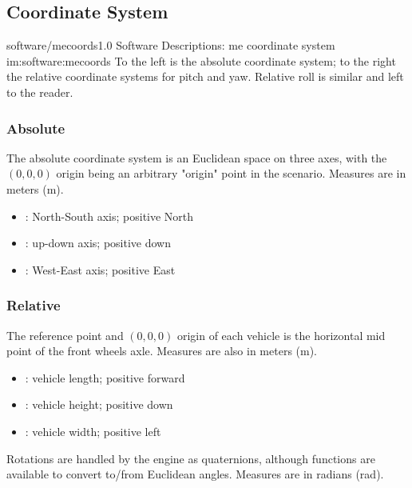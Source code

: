 \subsection{Coordinate System}

\begin{image}
	{software/mecoords}{1.0}
	{Software Descriptions: \gls{me} coordinate system}
	{im:software:mecoords}
	{}
	{To the left is the absolute coordinate system; to the right the relative coordinate systems for pitch and yaw. Relative roll is similar and left to the reader.}
\end{image}

\subsubsection{Absolute}

The absolute coordinate system is an Euclidean space on three axes, with the $(0,0,0)$ origin being an arbitrary "origin" point in the scenario. Measures are in meters (\si{\meter}).

\begin{itemize}
	\item {}: North-South axis; positive North
	\item {}: up-down axis; positive down
	\item {}: West-East axis; positive East
\end{itemize}

\subsubsection{Relative}

The reference point and $(0,0,0)$ origin of each vehicle is the horizontal mid point of the front wheels axle. Measures are also in meters (\si{\meter}).

\begin{itemize}
	\item {}: vehicle length; positive forward
	\item {}: vehicle height; positive down
	\item {}: vehicle width; positive left
\end{itemize}

\FLOATnoindent Rotations are handled by the engine as quaternions, although functions are available to convert to/from Euclidean angles. Measures are in radians (\si{\radian}).

